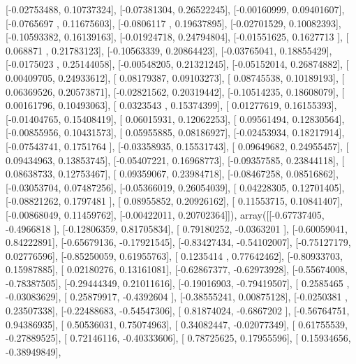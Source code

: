 \documentclass{article}
\begin{document}
       [-0.02753488,  0.10737324],
       [-0.07381304,  0.26522245],
       [-0.00160999,  0.09401607],
       [-0.0765697 ,  0.11675603],
       [-0.0806117 ,  0.19637895],
       [-0.02701529,  0.10082393],
       [-0.10593382,  0.16139163],
       [-0.01924718,  0.24794804],
       [-0.01551625,  0.1627713 ],
       [ 0.068871  ,  0.21783123],
       [-0.10563339,  0.20864423],
       [-0.03765041,  0.18855429],
       [-0.0175023 ,  0.25144058],
       [-0.00548205,  0.21321245],
       [-0.05152014,  0.26874882],
       [ 0.00409705,  0.24933612],
       [ 0.08179387,  0.09103273],
       [ 0.08745538,  0.10189193],
       [ 0.06369526,  0.20573871],
       [-0.02821562,  0.20319442],
       [-0.10514235,  0.18608079],
       [ 0.00161796,  0.10493063],
       [ 0.0323543 ,  0.15374399],
       [ 0.01277619,  0.16155393],
       [-0.01404765,  0.15408419],
       [ 0.06015931,  0.12062253],
       [ 0.09561494,  0.12830564],
       [-0.00855956,  0.10431573],
       [ 0.05955885,  0.08186927],
       [-0.02453934,  0.18217914],
       [-0.07543741,  0.1751764 ],
       [-0.03358935,  0.15531743],
       [ 0.09649682,  0.24955457],
       [ 0.09434963,  0.13853745],
       [-0.05407221,  0.16968773],
       [-0.09357585,  0.23844118],
       [ 0.08638733,  0.12753467],
       [ 0.09359067,  0.23984718],
       [-0.08467258,  0.08516862],
       [-0.03053704,  0.07487256],
       [-0.05366019,  0.26054039],
       [ 0.04228305,  0.12701405],
       [-0.08821262,  0.1797481 ],
       [ 0.08955852,  0.20926162],
       [ 0.11553715,  0.10841407],
       [-0.00868049,  0.11459762],
       [-0.00422011,  0.20702364]]), array([[-0.67737405, -0.4966818 ],
       [-0.12806359,  0.81705834],
       [ 0.79180252, -0.0363201 ],
       [-0.60059041,  0.84222891],
       [-0.65679136, -0.17921545],
       [-0.83427434, -0.54102007],
       [-0.75127179,  0.02776596],
       [-0.85250059,  0.61955763],
       [ 0.1235414 ,  0.77642462],
       [-0.80933703,  0.15987885],
       [ 0.02180276,  0.13161081],
       [-0.62867377, -0.62973928],
       [-0.55674008, -0.78387505],
       [-0.29444349,  0.21011616],
       [-0.19016903, -0.79419507],
       [ 0.2585465 , -0.03083629],
       [ 0.25879917, -0.4392604 ],
       [-0.38555241,  0.00875128],
       [-0.0250381 ,  0.23507338],
       [-0.22488683, -0.54547306],
       [ 0.81874024, -0.6867202 ],
       [-0.56764751,  0.94386935],
       [ 0.50536031,  0.75074963],
       [ 0.34082447, -0.02077349],
       [ 0.61755539, -0.27889525],
       [ 0.72146116, -0.40333606],
       [ 0.78725625,  0.17955596],
       [ 0.15934656, -0.38949849],
\end{document}
